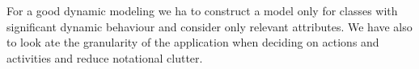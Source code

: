 \documentclass[12pt, a4paper]{report}
\newtheorem[style=M,bodystyle=\normalfont]{theorem}{Theorem}
\newtheorem[style=M,bodystyle=\normalfont]{corollary}{Corollary}
\newtheorem[style=M,bodystyle=\normalfont]{lemma}{Lemma}
\newtheorem[style=M,bodystyle=\normalfont]{definition}{Definition}
\begin{document}
    For a good dynamic modeling we ha to construct a model only for classes with significant dynamic behaviour and consider only relevant attributes. We have also to look ate the
    granularity of the application when deciding on actions and activities and reduce notational clutter.






    

    
\end{document}
